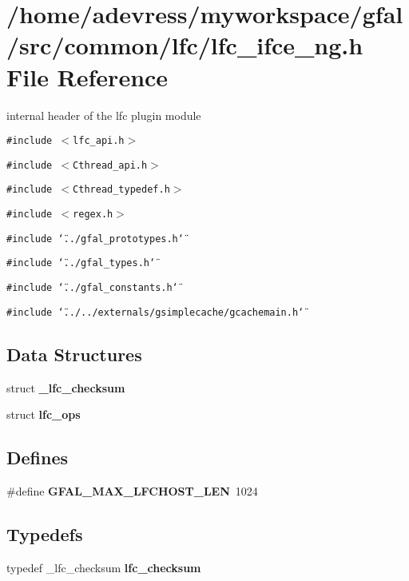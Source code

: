 \section{/home/adevress/myworkspace/gfal/src/common/lfc/lfc\_\-ifce\_\-ng.h File Reference}
\label{lfc__ifce__ng_8h}
internal header of the lfc plugin module 

{\tt \#include $<$lfc\_\-api.h$>$}\par
{\tt \#include $<$Cthread\_\-api.h$>$}\par
{\tt \#include $<$Cthread\_\-typedef.h$>$}\par
{\tt \#include $<$regex.h$>$}\par
{\tt \#include \char`\"{}../gfal\_\-prototypes.h\char`\"{}}\par
{\tt \#include \char`\"{}../gfal\_\-types.h\char`\"{}}\par
{\tt \#include \char`\"{}../gfal\_\-constants.h\char`\"{}}\par
{\tt \#include \char`\"{}../../externals/gsimplecache/gcachemain.h\char`\"{}}\par
\subsection*{Data Structures}
\begin{CompactItemize}
\item 
struct \textbf{\_\-lfc\_\-checksum}
\item 
struct \textbf{lfc\_\-ops}
\end{CompactItemize}
\subsection*{Defines}
\begin{CompactItemize}
\item 
\#define \textbf{GFAL\_\-MAX\_\-LFCHOST\_\-LEN}~1024\label{lfc__ifce__ng_8h_4ba01f362057d237e7234f527da40cdb}

\end{CompactItemize}
\subsection*{Typedefs}
\begin{CompactItemize}
\item 
typedef \_\-lfc\_\-checksum \textbf{lfc\_\-checksum}\label{lfc__ifce__ng_8h_d86e20d6f06b763b9bbeec769a96651e}

\end{CompactItemize}
